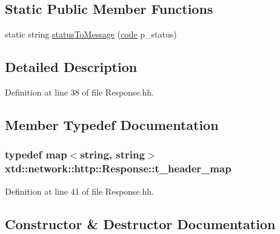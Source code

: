 \subsection*{Static Public Member Functions}
\begin{DoxyCompactItemize}
\item 
static string \hyperlink{classxtd_1_1network_1_1http_1_1Response_a506c65d70d06920833faa26e7656407b}{status\+To\+Message} (\hyperlink{namespacextd_1_1network_1_1http_a55148922a7d13fe756e53e2ccad4b89c}{code} p\+\_\+status)
\end{DoxyCompactItemize}


\subsection{Detailed Description}


Definition at line 38 of file Response.\+hh.



\subsection{Member Typedef Documentation}
\subsubsection[{\texorpdfstring{t\+\_\+header\+\_\+map}{t_header_map}}]{\setlength{\rightskip}{0pt plus 5cm}typedef map$<$string, string$>$ {\bf xtd\+::network\+::http\+::\+Response\+::t\+\_\+header\+\_\+map}}\hypertarget{classxtd_1_1network_1_1http_1_1Response_a77c534464429597bc4faa6bb556a8b53}{}\label{classxtd_1_1network_1_1http_1_1Response_a77c534464429597bc4faa6bb556a8b53}


Definition at line 41 of file Response.\+hh.



\subsection{Constructor \& Destructor Documentation}
